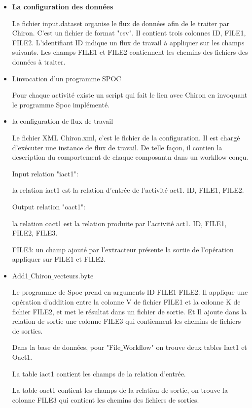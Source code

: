 \begin{itemize}

\item {\bf La configuration des données}

Le fichier input.dataset organise le flux de données afin de le traiter par Chiron. C'est un fichier de format "csv". Il contient trois colonnes ID, FILE1, FILE2. L'identifiant ID indique un flux de travail à appliquer sur les champs suivants. Les champs FILE1 et FILE2 contiennent les chemins des fichiers des données à traiter. %


\item{Linvocation d'un programme SPOC }

Pour chaque activité existe un script qui fait le lien avec Chiron en invoquant le programme Spoc implémenté.




\item {la configuration de flux de travail}

Le fichier XML Chiron.xml, c'est le fichier de la configuration. Il est chargé d'exécuter une instance de flux de travail. De telle façon, il contien la description du comportement de chaque composantn dans un workflow conçu.

Input relation "iact1":

la relation iact1 est la relation d'entrée de l'activité act1. ID, FILE1, FILE2.

Output relation "oact1":

la relation oact1 est la relation produite par l'activité act1. ID, FILE1, FILE2, FILE3.

FILE3: un champ ajouté par l'extracteur présente la sortie de l'opération appliquer sur FILE1 et FILE2. 


\item {Add1$\_$Chiron$\_$vecteurs.byte}


Le programme de Spoc prend en arguments ID FILE1 FILE2. Il applique une opération d'addition entre la colonne V de fichier FILE1 et la colonne K de fichier FILE2, et met le résultat dans un fichier de sortie. Et Il ajoute dans la relation de sortie une colonne FILE3 qui contiennent les chemins de fichiers de sorties.





Dans la base de données, pour "File$\_$Workflow" on trouve deux tables Iact1 et Oact1.

La table iact1 contient les champs de la relation d'entrée.

La table oact1 contient les champs de la relation de sortie, on trouve la colonne FILE3 qui contient les chemins des fichiers de sorties.


\end{itemize}



